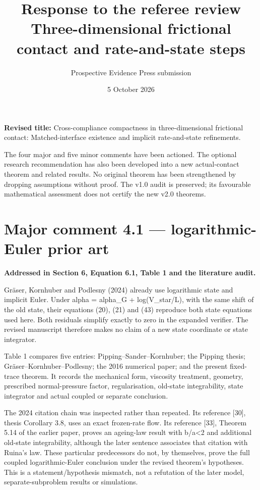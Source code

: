 \documentclass[11pt,a4paper]{article}
\title{\vspace{-12mm}\textbf{Response to the referee review}\\[4pt]\large Three-dimensional frictional contact and rate-and-state steps}
\author{\small Prospective Evidence Press submission}\date{5 October 2026}
\begin{document}
\maketitle

\textbf{Revised title:} Cross-compliance compactness in three-dimensional frictional contact: Matched-interface existence and implicit rate-and-state refinements.

The four major and five minor comments have been actioned. The optional research recommendation has also been developed into a new actual-contact theorem and related results. No original theorem has been strengthened by dropping assumptions without proof. The v1.0 audit is preserved; its favourable mathematical assessment does not certify the new v2.0 theorems.

\section*{Major comment 4.1 — logarithmic-Euler prior art}
\textbf{Addressed in Section 6, Equation 6.1, Table 1 and the literature audit.}

Gräser, Kornhuber and Podlesny (2024) already use logarithmic state and implicit Euler. Under alpha = alpha\_G + log(V\_star/L), with the same shift of the old state, their equations (20), (21) and (43) reproduce both state equations used here. Both residuals simplify exactly to zero in the expanded verifier. The revised manuscript therefore makes no claim of a new state coordinate or state integrator.

Table 1 compares five entries: Pipping–Sander–Kornhuber; the Pipping thesis; Gräser–Kornhuber–Podlesny; the 2016 numerical paper; and the present fixed-trace theorem. It records the mechanical form, viscosity treatment, geometry, prescribed normal-pressure factor, regularisation, old-state integrability, state integrator and actual coupled or separate conclusion.

The 2024 citation chain was inspected rather than repeated. Its reference [30], thesis Corollary 3.8, uses an exact frozen-rate flow. Its reference [33], Theorem 5.14 of the earlier paper, proves an ageing-law result with b/a<2 and additional old-state integrability, although the later sentence associates that citation with Ruina's law. These particular predecessors do not, by themselves, prove the full coupled logarithmic-Euler conclusion under the revised theorem's hypotheses. This is a statement/hypothesis mismatch, not a refutation of the later model, separate-subproblem results or simulations.
\end{document}
